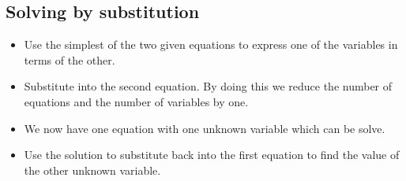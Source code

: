 \subsection*{Solving by substitution}
\begin{itemize}
 \item Use the simplest of the two given equations to express one of the variables in terms of the other.
\item Substitute into the second equation. By doing this we reduce the number of equations and the number of variables by one.
\item We now have one equation with one unknown variable which can be solve.
\item Use the solution to substitute back into the first equation to find the value of the other unknown variable.
\end{itemize}


